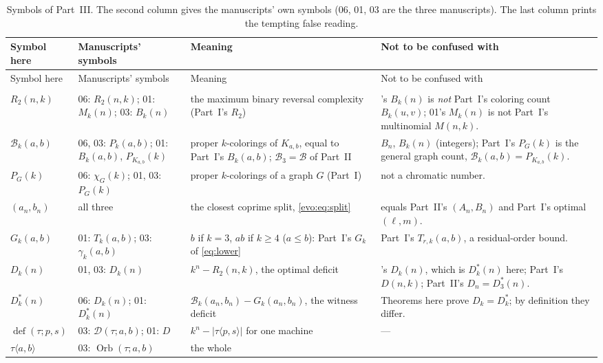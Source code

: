 \documentclass[11pt,a4paper]{article}
\numberwithin{equation}{section}
\theoremstyle{definition}
\theoremstyle{remark}
\newcommand{\Bip}{\mathcal B}
\newcommand{\defi}{\operatorname{def}}
\begin{document}
{\small
\begin{longtable}{>{\raggedright}p{.15\linewidth}>{\raggedright}p{.22\linewidth}>{\raggedright}p{.23\linewidth}>{\raggedright\arraybackslash}p{.26\linewidth}}
\caption{Symbols of Part~III. The second column gives the manuscripts' own
symbols (06, 01, 03 are the three manuscripts). The last column prints the
tempting false reading.}\label{evo:tab:notation}\\
\toprule
Symbol here & Manuscripts' symbols & Meaning & Not to be confused with\\
\midrule\endfirsthead
\toprule
Symbol here & Manuscripts' symbols & Meaning & Not to be confused with\\
\midrule\endhead
\midrule\multicolumn{4}{r}{\footnotesize Continued on next page}\\\endfoot
\bottomrule\endlastfoot
$R_2(n,k)$ & 06: $R_2(n,k)$; 01: $M_k(n)$; 03: $B_k(n)$ & the maximum
 binary reversal complexity (Part~I's $R_2$) & 03's $B_k(n)$ is \emph{not}
 Part~I's coloring count $B_k(u,v)$; 01's $M_k(n)$ is not Part~I's
 multinomial $M(n,k)$.\\
$\Bip_k(a,b)$ & 06, 03: $P_k(a,b)$; 01: $B_k(a,b)$, $P_{K_{a,b}}(k)$ & proper
 $k$-colorings of $K_{a,b}$, equal to Part~I's $B_k(a,b)$; $\Bip_3=\Bip$ of
 Part~II & $B_n$, $B_k(n)$ (integers); Part~I's $P_G(k)$ is the general graph
 count, $\Bip_k(a,b)=P_{K_{a,b}}(k)$.\\
$P_G(k)$ & 06: $\chi_G(k)$; 01, 03: $P_G(k)$ & proper $k$-colorings of a
 graph $G$ (Part~I) & not a chromatic number.\\
$(a_n,b_n)$ & all three & the closest coprime split, \eqref{evo:eq:split}
 & equals Part~II's $(A_n,B_n)$ and Part~I's optimal $(\ell,m)$.\\
$G_k(a,b)$ & 01: $T_k(a,b)$; 03: $\gamma_k(a,b)$ & $b$ if $k=3$, $ab$ if
 $k\ge4$ ($a\le b$): Part~I's $G_k$ of \eqref{eq:lower} & Part~I's
 $T_{r,k}(a,b)$, a residual-order bound.\\
$D_k(n)$ & 01, 03: $D_k(n)$ & $k^n-R_2(n,k)$, the optimal deficit & 06's
 $D_k(n)$, which is $D^*_k(n)$ here; Part~I's $D(n,k)$; Part~II's
 $D_n=D^*_3(n)$.\\
$D^*_k(n)$ & 06: $D_k(n)$; 01: $D^*_k(n)$ & $\Bip_k(a_n,b_n)-G_k(a_n,b_n)$,
 the witness deficit & Theorems here prove $D_k=D^*_k$; by definition they
 differ.\\
$\defi(\tau;p,s)$ & 03: $\mathcal D(\tau;a,b)$; 01: $D$ &
 $k^n-|\tau\langle p,s\rangle|$ for one machine & ---\\
$\tau\langle a,b\rangle$ & 03: $\operatorname{Orb}(\tau;a,b)$ & the whole

\end{longtable}}
\end{document}
